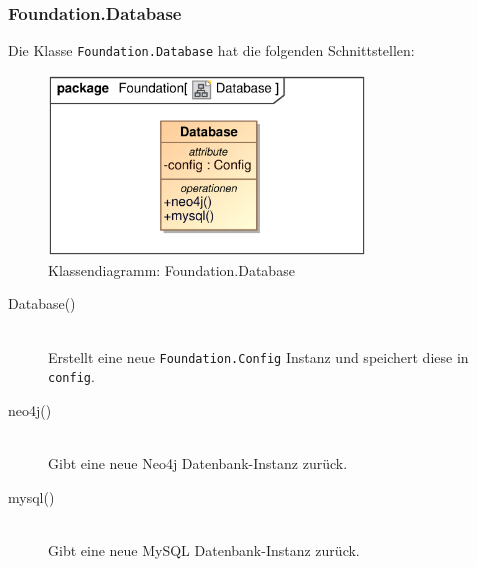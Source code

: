 \subsubsection{Foundation.Database}
Die Klasse \verb|Foundation.Database| hat die folgenden Schnittstellen:
\begin{figure}[H]
    \myfloatalign
    \includegraphics[width=0.75\textwidth]{gfx/MtGDeepAnalysis/Database.eps}
    \caption{Klassendiagramm: Foundation.Database}
    \label{fig:class:foundation.database}
\end{figure}
\begin{description}
    \item[Database()] \hfill \\
    Erstellt eine neue \verb|Foundation.Config| Instanz und speichert diese in \verb|config|.
    
    \item[neo4j()] \hfill \\
    Gibt eine neue Neo4j Datenbank-Instanz zurück.
    
    \item[mysql()] \hfill \\
    Gibt eine neue MySQL Datenbank-Instanz zurück.
\end{description}

